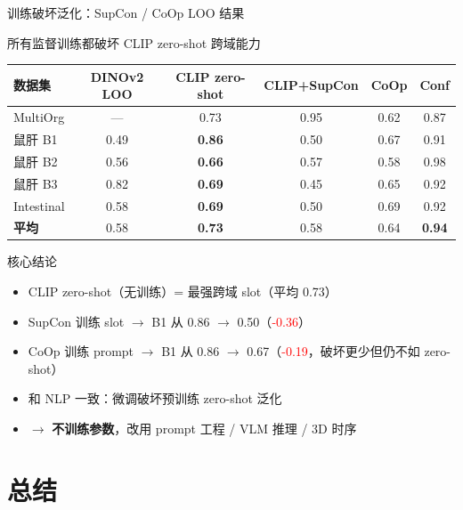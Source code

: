 \documentclass[aspectratio=169, 10pt]{beamer}
\begin{document}
\begin{frame}{训练破坏泛化：SupCon / CoOp LOO 结果}
  \begin{alertblock}{所有监督训练都破坏 CLIP zero-shot 跨域能力}
    \scriptsize
    \begin{tabular}{lccccc}
      \toprule
      \textbf{数据集} & \textbf{DINOv2 LOO} & \textbf{CLIP zero-shot} & \textbf{CLIP+SupCon} & \textbf{CoOp} & \textbf{Conf} \\
      \midrule
      MultiOrg & — & 0.73 & 0.95 & 0.62 & 0.87 \\
      鼠肝 B1 & 0.49 & \textbf{0.86} & 0.50 & 0.67 & 0.91 \\
      鼠肝 B2 & 0.56 & \textbf{0.66} & 0.57 & 0.58 & 0.98 \\
      鼠肝 B3 & 0.82 & \textbf{0.69} & 0.45 & 0.65 & 0.92 \\
      Intestinal & 0.58 & \textbf{0.69} & 0.50 & 0.69 & 0.92 \\
      \midrule
      \textbf{平均} & 0.58 & \textbf{0.73} & 0.58 & 0.64 & \textbf{0.94} \\
      \bottomrule
    \end{tabular}
  \end{alertblock}
  \vspace{0em}
  \begin{block}{核心结论}
    \begin{itemize}
      \item CLIP zero-shot（无训练）= 最强跨域 slot（平均 0.73）
      \item SupCon 训练 slot $\to$ B1 从 0.86 $\to$ 0.50（\textcolor{red}{-0.36}）
      \item CoOp 训练 prompt $\to$ B1 从 0.86 $\to$ 0.67（\textcolor{red}{-0.19}，破坏更少但仍不如 zero-shot）
      \item 和 NLP 一致：微调破坏预训练 zero-shot 泛化
      \item $\to$ \textbf{不训练参数}，改用 prompt 工程 / VLM 推理 / 3D 时序
    \end{itemize}
  \end{block}
\end{frame}


\section{总结}
\end{document}
